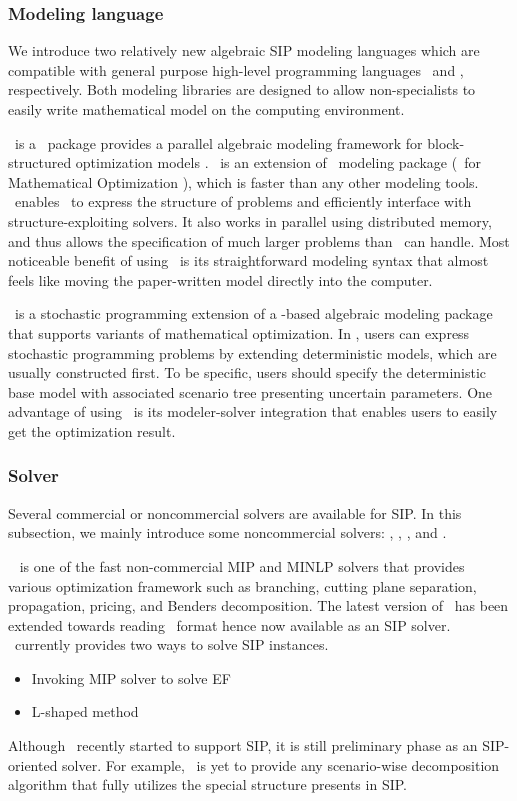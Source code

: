 \subsubsection{Modeling language}
We introduce two relatively new algebraic SIP modeling languages which are compatible with general purpose high-level programming languages \julia\ and \python, respectively. Both modeling libraries are designed to allow non-specialists to easily write mathematical model on the computing environment.

\structjump\ is a \julia\ package provides a parallel algebraic modeling framework for block-structured optimization models \cite{web:StructJuMP}. \structjump\ is an extension of \jump\ modeling package (\julia\ for Mathematical Optimization \cite{journal:JuMP}), which is faster than any other modeling tools. \structjump\ enables \jump\ to express the structure of problems and efficiently interface with structure-exploiting solvers. It also works in parallel using distributed memory, and thus allows the specification of much larger problems than \jump\ can handle. Most noticeable benefit of using \structjump\ is its straightforward modeling syntax that almost feels like moving the paper-written model directly into the computer.

\pysp\ is a stochastic programming extension of a \python-based algebraic modeling package \pyomo\ \cite{book:pyomo} that supports variants of mathematical optimization. In \pysp, users can express stochastic programming problems by extending deterministic models, which are usually constructed first. To be specific, users should specify the deterministic base model with associated scenario tree presenting uncertain parameters. One advantage of using \pysp\ is its modeler-solver integration that enables users to easily get the optimization result.

\subsubsection{Solver}
Several commercial or noncommercial solvers are available for SIP. In this subsection, we mainly introduce some noncommercial solvers: \scip, \dsp, \pysp, and \pipssbb.

\scip\ \cite{SCIP} is one of the fast non-commercial MIP and MINLP solvers that provides various optimization framework such as branching, cutting plane separation, propagation, pricing, and Benders decomposition. The latest version of \scip\ has been extended towards reading \smps\ format hence now available as an SIP solver. \scip\ currently provides two ways to solve SIP instances.
\begin{itemize}
	\item Invoking MIP solver to solve EF
	\item L-shaped method
\end{itemize}
Although \scip\ recently started to support SIP, it is still preliminary phase as an SIP-oriented solver. For example, \scip\ is yet to provide any scenario-wise decomposition algorithm that fully utilizes the special structure presents in SIP.

